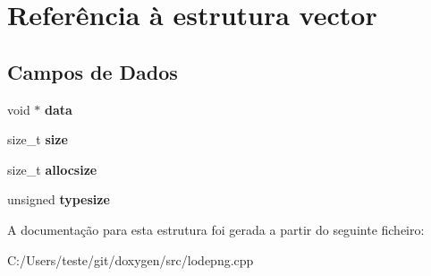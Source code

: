 \hypertarget{structvector}{\section{Referência à estrutura vector}
\label{structvector}
}
\subsection*{Campos de Dados}
\begin{DoxyCompactItemize}
\item 
\hypertarget{structvector_a735984d41155bc1032e09bece8f8d66d}{void $\ast$ {\bfseries data}}\label{structvector_a735984d41155bc1032e09bece8f8d66d}

\item 
\hypertarget{structvector_a854352f53b148adc24983a58a1866d66}{size\-\_\-t {\bfseries size}}\label{structvector_a854352f53b148adc24983a58a1866d66}

\item 
\hypertarget{structvector_a5a20ebbe2e7f1b4cdaafb193b7a4a6a0}{size\-\_\-t {\bfseries allocsize}}\label{structvector_a5a20ebbe2e7f1b4cdaafb193b7a4a6a0}

\item 
\hypertarget{structvector_a3d33609b7b462b6ead76759df4942040}{unsigned {\bfseries typesize}}\label{structvector_a3d33609b7b462b6ead76759df4942040}

\end{DoxyCompactItemize}


A documentação para esta estrutura foi gerada a partir do seguinte ficheiro\-:\begin{DoxyCompactItemize}
\item 
C\-:/\-Users/teste/git/doxygen/src/lodepng.\-cpp\end{DoxyCompactItemize}
